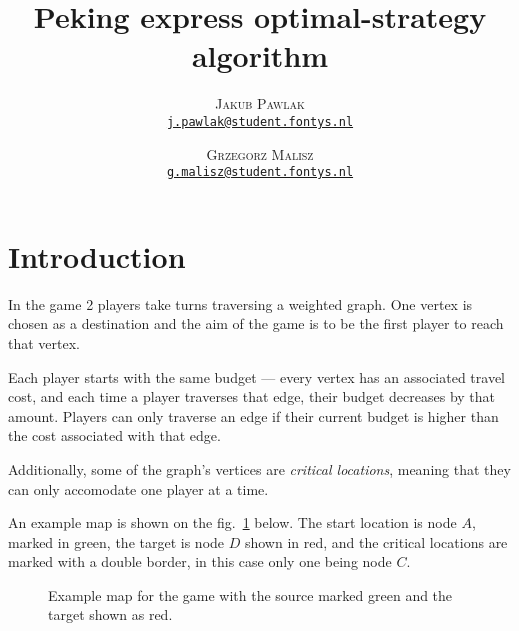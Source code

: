 \documentclass[12pt]{article}
\author{
    \textsc{Jakub Pawlak}\\
    \href{mailto:j.pawlak@student.fontys.nl}{\texttt{j.pawlak@student.fontys.nl}}
    \and 
    \textsc{Grzegorz Malisz}\\
    \href{mailto:g.malisz@student.fontys.nl}{\texttt{g.malisz@student.fontys.nl}}
}
\title{\sffamily\bfseries\Huge Peking express optimal-strategy algorithm}
\begin{document}
\begin{titlepage}
    \maketitle
    \thispagestyle{empty}
    \tableofcontents
    \restoregeometry
\end{titlepage}
\setcounter{page}{2}

\section{Introduction}

In the game 2 players take turns traversing a weighted graph.
One vertex is chosen as a destination and the aim of the game is to be the first player to reach that vertex.

Each player starts with the same budget --- every vertex has an associated travel cost, and each time a player traverses that edge, their budget decreases by that amount.
Players can only traverse an edge if their current budget is higher than the cost associated with that edge.

Additionally, some of the graph's vertices are \emph{critical locations}, meaning that they can only accomodate one player at a time.

An example map is shown on the fig.~\ref*{fig:example-map} below.
The start location is node $A$, marked in green, the target is node $D$ shown in red,
and the critical locations are marked with a double border, in this case only one being node $C$.

\begin{figure}[H]\centering
    \caption{Example map for the game with the source marked green and the target shown as red.}
    \label{fig:example-map}
\end{figure}
\end{document}
